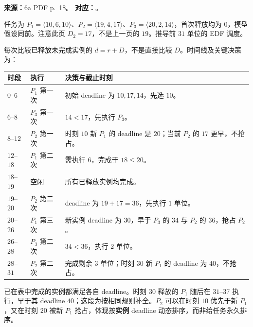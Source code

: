 \par\noindent\begin{minipage}{\textwidth}

\textbf{来源：}6a PDF p.~18。\quad
\textbf{对应：}。

任务为 $P_1=\langle10,6,10\rangle$、$P_2=\langle19,4,17\rangle$、$P_3=\langle20,2,14\rangle$，首次释放均为 $0$，模型假设同前。注意此页 $D_2=17$，不是上一页的 $19$。推导前 $31$ 单位的 EDF 调度。
\end{minipage}\par

\begin{checkedsolution}
每次比较已释放未完成实例的 $d=r+D$，不是直接比较 $D$。时间线及关键决策为：
\begin{center}
\begin{tabularx}{\textwidth}{@{}llX@{}}
\toprule
时段 & 执行 & 决策与截止时刻 \\
\midrule
$0$--$6$ & $P_1$ 第一次 & 初始 deadline 为 $10,17,14$，先选 $10$。 \\
$6$--$8$ & $P_3$ 第一次 & $14<17$，先执行 $P_3$。 \\
$8$--$12$ & $P_2$ 第一次 & 时刻 $10$ 新 $P_1$ 的 deadline 是 $20$；当前 $P_2$ 的 $17$ 更早，不抢占。 \\
$12$--$18$ & $P_1$ 第二次 & 需执行 $6$，完成于 $18\le20$。 \\
$18$--$19$ & 空闲 & 所有已释放实例均完成。 \\
$19$--$20$ & $P_2$ 第二次 & deadline 为 $19+17=36$，先执行 $1$ 单位。 \\
$20$--$26$ & $P_1$ 第三次 & 新实例 deadline 为 $30$，早于 $P_3$ 的 $34$ 与 $P_2$ 的 $36$，抢占 $P_2$。 \\
$26$--$28$ & $P_3$ 第二次 & $34<36$，执行 $2$ 单位。 \\
$28$--$31$ & $P_2$ 第二次 & 完成剩余 $3$ 单位；时刻 $30$ 新 $P_1$ 的 deadline 为 $40$，不抢占。 \\
\bottomrule
\end{tabularx}
\end{center}
已在表中完成的实例都满足各自 deadline。时刻 $30$ 释放的 $P_1$ 随后在 $31$--$37$ 执行，早于其 deadline $40$；这段为按相同规则补全。$P_2$ 可以在时刻 $10$ 优先于新 $P_1$，又在时刻 $20$ 被新 $P_1$ 抢占，体现按\textbf{实例} deadline 动态排序，而非给任务永久排序。
\end{checkedsolution}
